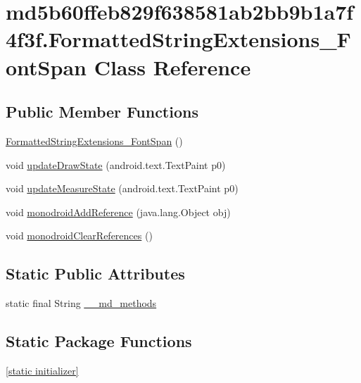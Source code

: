 \hypertarget{classmd5b60ffeb829f638581ab2bb9b1a7f4f3f_1_1_formatted_string_extensions___font_span}{
\section{md5b60ffeb829f638581ab2bb9b1a7f4f3f.FormattedStringExtensions\_\-FontSpan Class Reference}
\label{classmd5b60ffeb829f638581ab2bb9b1a7f4f3f_1_1_formatted_string_extensions___font_span}
}
\subsection*{Public Member Functions}
\begin{CompactItemize}
\item 
\hyperlink{classmd5b60ffeb829f638581ab2bb9b1a7f4f3f_1_1_formatted_string_extensions___font_span_6bdea9f0d35607dd50fc6a79bc4a2fd8}{FormattedStringExtensions\_\-FontSpan} ()
\item 
void \hyperlink{classmd5b60ffeb829f638581ab2bb9b1a7f4f3f_1_1_formatted_string_extensions___font_span_97b8c1219694dcb15d384eef823d2e26}{updateDrawState} (android.text.TextPaint p0)
\item 
void \hyperlink{classmd5b60ffeb829f638581ab2bb9b1a7f4f3f_1_1_formatted_string_extensions___font_span_7dae2ceacb0d10c2779b20b414c80a5b}{updateMeasureState} (android.text.TextPaint p0)
\item 
void \hyperlink{classmd5b60ffeb829f638581ab2bb9b1a7f4f3f_1_1_formatted_string_extensions___font_span_943edf05988a3ee0617593770d19dc2e}{monodroidAddReference} (java.lang.Object obj)
\item 
void \hyperlink{classmd5b60ffeb829f638581ab2bb9b1a7f4f3f_1_1_formatted_string_extensions___font_span_c530c8771610db1c7c647982314f8a4e}{monodroidClearReferences} ()
\end{CompactItemize}
\subsection*{Static Public Attributes}
\begin{CompactItemize}
\item 
static final String \hyperlink{classmd5b60ffeb829f638581ab2bb9b1a7f4f3f_1_1_formatted_string_extensions___font_span_9dd575283d39b7b83571ef7dbbde9f63}{\_\-\_\-md\_\-methods}
\end{CompactItemize}
\subsection*{Static Package Functions}
\begin{CompactItemize}
\item 
\hyperlink{classmd5b60ffeb829f638581ab2bb9b1a7f4f3f_1_1_formatted_string_extensions___font_span_391b05e685498c8f604f54fc89fdce42}{\mbox{[}static initializer\mbox{]}}
\end{CompactItemize}
